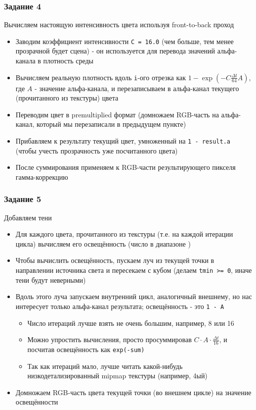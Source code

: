\documentclass{beamer}
\begin{document}
\begin{frame}[fragile]
\frametitle{Задание 4}
Вычисляем настоящую интенсивность цвета используя front-to-back проход
\begin{itemize}
\item Заводим коэффициент интенсивности \verb|C = 16.0| (чем больше, тем менее прозрачной будет сцена) - он используется для перевода значений альфа-канала в плотность среды
\pause
\item Вычисляем реальную плотность вдоль \verb|i|-ого отрезка как \begin{math}1 - \exp(- C \frac{\Delta t}{64} A)\end{math}, где \begin{math}A\end{math} - значение альфа-канала, и перезаписываем в альфа-канал текущего (прочитанного из текстуры) цвета
\pause
\item Переводим цвет в premultiplied формат (домножаем RGB-часть на альфа-канал, который мы перезаписали в предыдущем пункте)
\pause
\item Прибавляем к результату текущий цвет, умноженный на \verb|1 - result.a| (чтобы учесть прозрачность уже посчитанного цвета)
\pause
\item После суммирования применяем к RGB-части результирующего пикселя гамма-коррекцию
\end{itemize}
\end{frame}

\begin{frame}[fragile]
\frametitle{Задание 5}
Добавляем тени
\begin{itemize}
\item Для каждого цвета, прочитанного из текстуры (т.е. на каждой итерации цикла) вычисляем его освещённость (число в диапазоне \begin{math}[0, 1]\end{math})
\pause
\item Чтобы вычислить освещённость, пускаем луч из текущей точки в направлении источника света и пересекаем с кубом (делаем \verb|tmin >= 0|, иначе тени будут неверными)
\pause
\item Вдоль этого луча запускаем внутренний цикл, аналогичный внешнему, но нас интересует только альфа-канал результата; освещённость - это \verb|1 - A|
\begin{itemize}
\item Число итераций лучше взять не очень большим, например, 8 или 16
\item Можно упростить вычисления, просто просуммировав \begin{math}C \cdot A \cdot \frac{\Delta t}{16}\end{math}, и посчитав освещённость как \verb|exp(-sum)|
\item Так как итераций мало, лучше читать какой-нибудь низкодетализированный mipmap текстуры (например, 4ый)
\end{itemize}
\pause
\item Домножаем RGB-часть цвета текущей точки (во внешнем цикле) на значение освещённости
\end{itemize}
\end{frame}
\end{document}
